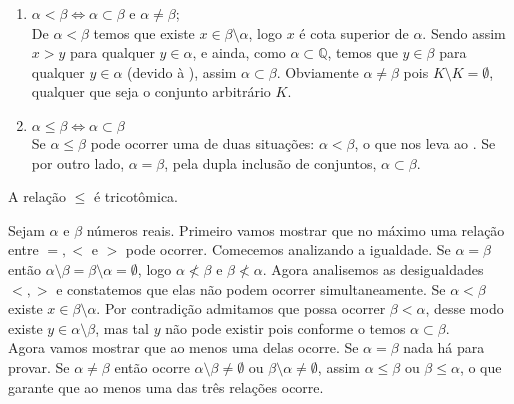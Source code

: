 \documentclass[../main.tex]{subfiles}
\begin{document}
\begin{dem}
    \begin{enumerate}[label=(\roman*)]
        \item\label{reais-dummy-subset} $\alpha < \beta \iff \alpha \subset \beta$ e $\alpha \neq \beta$; \\
        De $\alpha < \beta$ temos que existe $x \in \beta \setminus \alpha$, logo $x$ é cota superior de $\alpha$. Sendo assim $x > y$ para qualquer $y \in \alpha$, e ainda, como $\alpha \subset \mathbb{Q}$, temos que $y \in \beta$ para qualquer $y \in \alpha$ (devido à ), assim $\alpha \subset \beta$. Obviamente $\alpha \neq \beta$ pois $K \setminus K  = \emptyset$, qualquer que seja o conjunto arbitrário $K$.
        
        \item $\alpha \leq \beta \iff \alpha \subset \beta$ \\
        Se $\alpha \leq \beta$ pode ocorrer uma de duas situações: $\alpha < \beta$, o que nos leva ao . Se por outro lado, $\alpha = \beta$, pela dupla inclusão de conjuntos, $\alpha \subset \beta$. 
    \end{enumerate}
\end{dem}

\begin{teo}
    A relação $\leq$ é tricotômica.
\end{teo}
\begin{dem}
    Sejam $\alpha$ e $\beta$ números reais.
    Primeiro vamos mostrar que no máximo uma relação entre $=, <$ e $>$ pode ocorrer.
    Comecemos analizando a igualdade. Se $\alpha = \beta$ então $\alpha \setminus \beta = \beta \setminus \alpha = \emptyset$, logo $\alpha \not< \beta$ e $\beta \not< \alpha$.
    Agora analisemos as desigualdades $<, >$ e constatemos que elas não podem ocorrer simultaneamente. Se $\alpha < \beta$ existe $x \in \beta \setminus \alpha$. Por contradição admitamos que possa ocorrer $\beta < \alpha$, desse modo existe $y \in \alpha \setminus \beta$, mas tal $y$ não pode existir pois conforme o  temos $\alpha \subset \beta$. \\

    Agora vamos mostrar que ao menos uma delas ocorre. Se $\alpha = \beta$ nada há para provar. Se $\alpha \neq \beta$ então ocorre $\alpha \setminus \beta \neq \emptyset$ ou $\beta \setminus \alpha \neq \emptyset$, assim $\alpha \leq \beta$ ou $\beta \leq \alpha$, o que garante que ao menos uma das três relações ocorre.
\end{dem}
\end{document}
